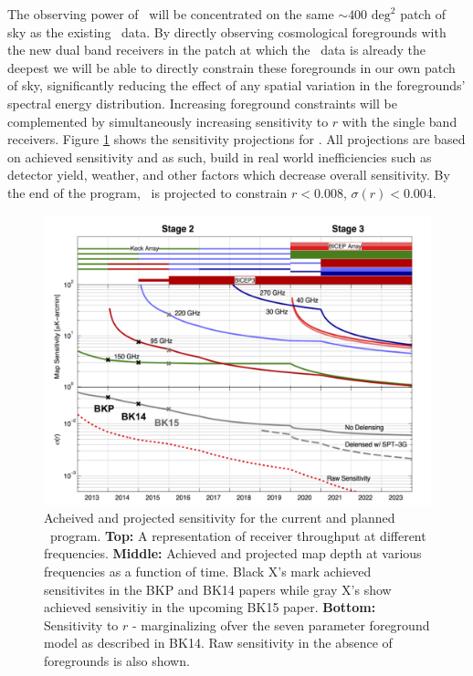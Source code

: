 \documentclass[]{spie}  %
\begin{document}
The observing power of \biceparray \ will be concentrated on the same $\sim400
\text{ deg}^2$ patch of sky as the existing \bk \ data. By directly
observing cosmological foregrounds with the new dual band receivers in the
patch at which the \bk \ data is already the deepest we will be able to
directly constrain these foregrounds in our own patch of sky, significantly
reducing the effect of any spatial variation in the foregrounds' spectral
energy distribution. Increasing foreground constraints will be complemented by
simultaneously increasing sensitivity to $r$ with the single band receivers. Figure \ref{fig:projections} shows the sensitivity projections for \biceparray. All projections are based on achieved sensitivity and as such, build in real world inefficiencies such as detector yield, weather, and other factors which decrease overall sensitivity. By the end of the program, \biceparray \ is projected to constrain $r<0.008$, $\sigma (r)<0.004$.


\begin{figure}[hb]
\center
\includegraphics[scale=0.4]{projections.pdf}
\caption{Acheived and projected sensitivity for the current and planned \bk \ program. \textbf{Top:} A representation of receiver throughput at different frequencies. \textbf{Middle:} Achieved and projected map depth at various frequencies as a function of time. Black X's mark achieved sensitivites in the BKP\cite{bkp} and BK14\cite{bk14} papers while gray X's show achieved sensivitiy in the upcoming BK15 paper. \textbf{Bottom:} Sensitivity to $r$ - marginalizing ofver the seven parameter foreground model as described in BK14. Raw sensitivity in the absence of foregrounds is also shown.}
\label{fig:projections}
\end{figure}









\end{document}
